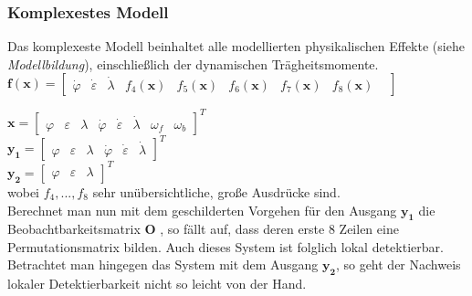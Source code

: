\documentclass[times, 10pt,twocolumn]{article}
\begin{document}
	\subsubsection{Komplexestes Modell}
	Das komplexeste Modell beinhaltet alle modellierten physikalischen Effekte (siehe \textit{Modellbildung}), einschließlich der dynamischen Trägheitsmomente. \\
	$\bm f(\bm x) = \begin{bmatrix}
	\dot \varphi &
	\dot \varepsilon &
	\dot \lambda  &
	f_4(\bm x) &
	f_5(\bm x) &
	f_6(\bm x) &
	f_7(\bm x) &
	f_8(\bm x) &
	\end{bmatrix} $ \\ 

	$\bm x = \begin{bmatrix}
	\varphi & \varepsilon & \lambda & \dot \varphi & \dot \varepsilon & \dot \lambda & \omega_f & \omega_b
	\end{bmatrix}^T $ \\ 
	$\bm {y_1} = \begin{bmatrix}
	\varphi & \varepsilon & \lambda & \dot \varphi & \dot \varepsilon & \dot \lambda
	\end{bmatrix}^T $ \\
	$\bm {y_2} = \begin{bmatrix}
	\varphi & \varepsilon & \lambda 
	\end{bmatrix}^T $ \\ wobei $f_4, ..., f_8$ sehr unübersichtliche, große Ausdrücke sind. \\
	Berechnet man nun mit dem geschilderten Vorgehen für den Ausgang $\bm{y_1}$
	die Beobachtbarkeitsmatrix $\bm O$ , so fällt auf, dass deren erste 8 Zeilen eine Permutationsmatrix bilden. Auch dieses System ist folglich lokal detektierbar. \\
	Betrachtet man hingegen das System mit dem Ausgang $\bm{y_2}$, so geht der Nachweis lokaler Detektierbarkeit nicht so leicht von der Hand. 
\end{document}
